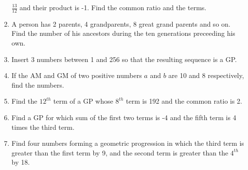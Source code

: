 \begin{enumerate}[label=\thesubsection.\arabic*.,ref=\thesubsection.\theenumi]
$\frac{13}{12}$ and their product is -1.  Find the common ratio and the terms.
\item A person has 2 parents, 4 grandparents, 8 great grand parents and so on.  Find the number of his ancestors during the ten generations preceeding his own.
\item Insert 3 numbers between 1 and 256 so that the resulting sequence is a GP.
\item If the AM and GM of two positive numbers $a$ and $b$ are 10 and 8 respectively, find the numbers.
\item Find the $12^{th}$ term of a GP  whose $8^{th}$ term is 192 and the common ratio is 2.
\item Find a GP  for which sum of the first two terms is -4 and the fifth term is 4 times the third term.
\item Find four numbers forming a geometric progression in which the third term is greater than the first term by 9, and the second term is greater than the $4^{th}$ by 18.
\end{enumerate}
